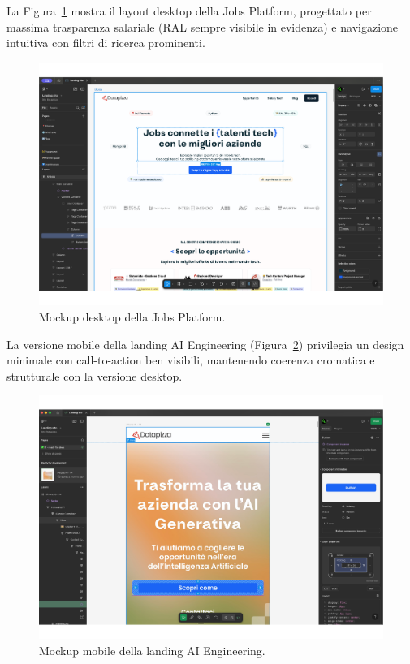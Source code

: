 \clearpage
La Figura~\ref{fig:jobs-desktop} mostra il layout desktop della Jobs Platform, 
progettato per massima trasparenza salariale (RAL sempre visibile in evidenza) 
e navigazione intuitiva con filtri di ricerca prominenti.
\begin{figure}[h!]
    \centering
    \includegraphics[width=1.06\textwidth]{chapters/figures/mockup.pdf}
    \caption{Mockup desktop della Jobs Platform.}
    \label{fig:jobs-desktop}
\end{figure}

\clearpage
La versione mobile della landing AI Engineering (Figura~\ref{fig:ai-eng-mobile}) 
privilegia un design minimale con call-to-action ben visibili, mantenendo 
coerenza cromatica e strutturale con la versione desktop.
\begin{figure}[h!]
    \centering
    \includegraphics[width=1.06\textwidth]{chapters/figures/mockup2.pdf}
    \caption{Mockup mobile della landing AI Engineering.}
    \label{fig:ai-eng-mobile}
\end{figure}
\clearpage

